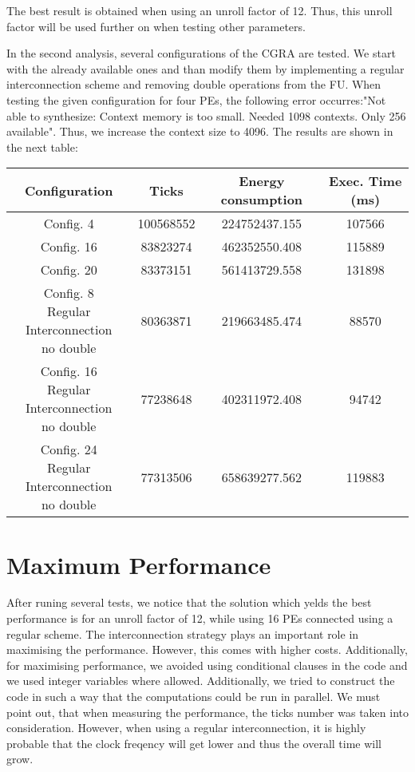   The best result is obtained when using an unroll factor of 12. Thus, this unroll factor will be used further on when testing other parameters. \newline
  
  In the second analysis, several configurations of the CGRA are tested. We start with the already available ones and than modify them by implementing a regular interconnection scheme and removing double operations from the FU. When testing the given configuration for four PEs, the following error occurres:"Not able to synthesize: Context memory is too small. Needed 1098 contexts. Only 256 available". Thus, we increase the context size to 4096. The results are shown in the next table:
  
  \begin{center}
    \begin{tabular}{||c | c c c ||} 
      \hline
      Configuration & Ticks & Energy consumption & Exec. Time (ms)\\ [0.5ex] 
      \hline\hline
      Config.  4 & 100568552 & 224752437.155 & 107566 \\
      \hline
      Config. 16 & 83823274 &462352550.408 & 115889 \\
      \hline
      Config. 20  & 83373151 & 561413729.558 & 131898 \\
      \hline
      \makecell{Config.  8\\Regular Interconnection\\ no double} & 80363871 & 219663485.474 & 88570 \\
      \hline
      {Config. 16 \\Regular Interconnection\\ no double}
 & 77238648 & 402311972.408 & 94742 \\  
      \hline
      {Config. 24 \\Regular Interconnection\\ no double}
 & 77313506 & 658639277.562 & 119883 \\  
      \hline
    \end{tabular}
  \end{center}
  
	\section{Maximum Performance} %
	\label{sec:impl_max_perf}
	\newline
	After runing several tests, we notice that the solution which yelds the best performance is for an unroll factor of 12, while using 16 PEs connected using a regular scheme. The interconnection strategy plays an important role in maximising the performance. However, this comes with higher costs. Additionally, for maximising performance, we avoided using conditional clauses in the code and we used integer variables where allowed. Additionally, we tried to construct the code in such a way that the computations could be run in parallel. We must point out, that when measuring the performance, the ticks number was taken into consideration. However, when using a regular interconnection, it is highly probable that the clock freqency will get lower and thus the overall time will grow. 
		
